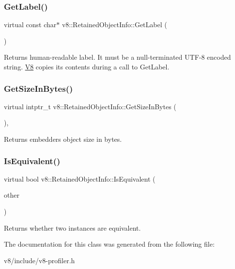 \subsubsection{\texorpdfstring{Get\+Label()}{GetLabel()}}
{\footnotesize\ttfamily virtual const char$\ast$ v8\+::\+Retained\+Object\+Info\+::\+Get\+Label (\begin{DoxyParamCaption}{ }\end{DoxyParamCaption})\hspace{0.3cm}{\ttfamily [pure virtual]}}

Returns human-\/readable label. It must be a null-\/terminated U\+T\+F-\/8 encoded string. \mbox{\hyperlink{classv8_1_1V8}{V8}} copies its contents during a call to Get\+Label. \mbox{\label{classv8_1_1RetainedObjectInfo_a1a899eed0b1f6e046edc3c7a7c08aa8c}} 
\subsubsection{\texorpdfstring{Get\+Size\+In\+Bytes()}{GetSizeInBytes()}}
{\footnotesize\ttfamily virtual intptr\+\_\+t v8\+::\+Retained\+Object\+Info\+::\+Get\+Size\+In\+Bytes (\begin{DoxyParamCaption}{ }\end{DoxyParamCaption})\hspace{0.3cm}{\ttfamily [inline]}, {\ttfamily [virtual]}}

Returns embedder\textquotesingle{}s object size in bytes. \mbox{\label{classv8_1_1RetainedObjectInfo_a286103bb076c85415919c86b1838c990}} 
\subsubsection{\texorpdfstring{Is\+Equivalent()}{IsEquivalent()}}
{\footnotesize\ttfamily virtual bool v8\+::\+Retained\+Object\+Info\+::\+Is\+Equivalent (\begin{DoxyParamCaption}\item[{\mbox{\hyperlink{classv8_1_1RetainedObjectInfo}{Retained\+Object\+Info}} $\ast$}]{other }\end{DoxyParamCaption})\hspace{0.3cm}{\ttfamily [pure virtual]}}

Returns whether two instances are equivalent. 

The documentation for this class was generated from the following file\+:\begin{DoxyCompactItemize}
\item 
v8/include/v8-\/profiler.\+h\end{DoxyCompactItemize}
